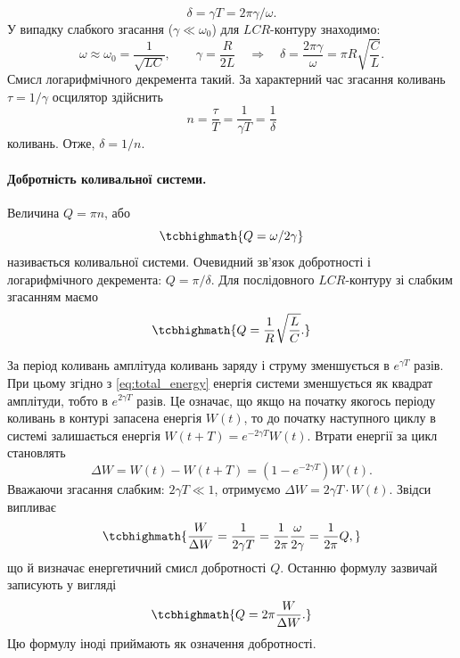\begin{equation}\label{eq:delta_explicit}
	\delta = \gamma T = 2\pi\gamma/\omega.
\end{equation}
У випадку слабкого згасання ($\gamma \ll \omega_0$) для $LCR$-контуру знаходимо:
\begin{equation}\label{eq:delta_weak}
	\omega \approx \omega_0 = \frac{1}{\sqrt{LC}}, \qquad
	\gamma = \frac{R}{2L}
	\quad\Rightarrow\quad
	\delta = \frac{2\pi\gamma}{\omega} = \pi R \sqrt{\frac{C}{L}}.
\end{equation}
Смисл логарифмічного декремента такий. За характерний
час згасання коливань $\tau = 1/\gamma$ осцилятор здійснить
\begin{equation}\label{eq:number_oscillations}
	n = \frac{\tau}{T} = \frac{1}{\gamma T} = \frac{1}{\delta}
\end{equation}
коливань. Отже, $\delta = 1/n$.

\paragraph*{Добротність коливальної системи.}
Величина $Q = \pi n$, або
\begin{equation}\label{eq:quality_factor}
	\tcbhighmath{
		Q = \omega/2\gamma
	}
\end{equation}
називається  коливальної системи. Очевидний зв'язок
добротності і логарифмічного декремента: $Q = \pi/\delta$. Для послідовного $LCR$-контуру зі слабким згасанням маємо
\begin{equation}\label{eq:Q_LCR}
	\tcbhighmath{
		Q = \frac{1}{R}\sqrt{\frac{L}{C}}.
	}
\end{equation}

За період коливань амплітуда коливань заряду і струму зменшується в
$e^{\gamma T}$ разів. При цьому згідно з \eqref{eq:total_energy} енергія системи зменшується як квадрат амплітуди, тобто в $e^{2\gamma T}$ разів. Це означає, що якщо на початку якогось періоду коливань в контурі запасена енергія $W(t)$, то до початку
наступного циклу в системі залишається енергія $W(t + T) = e^{-2\gamma T}W(t)$. Втрати енергії за цикл становлять
\begin{equation}\label{eq:energy_loss_cycle}
	\Delta W = W(t) - W(t + T) = \left(1 - e^{-2\gamma T}\right)W(t).
\end{equation}
Вважаючи згасання слабким: $2\gamma T \ll 1$, отримуємо $\Delta W = 2\gamma T \cdot W(t)$. Звідси
випливає
\begin{equation}\label{eq:quality_energy}
	\tcbhighmath{
		\frac{W}{\Delta W} = \frac{1}{2\gamma T} = \frac{1}{2\pi}\frac{\omega}{2\gamma} = \frac{1}{2\pi}Q,
	}
\end{equation}
що й визначає енергетичний смисл добротності $Q$. Останню
формулу зазвичай записують у вигляді
\begin{equation}\label{eq:Q_definition}
	\tcbhighmath{
		Q = 2\pi\frac{W}{\Delta W}.
	}
\end{equation}
Цю формулу іноді приймають як означення добротності.

